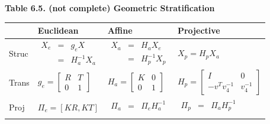 \documentclass{../cheat}
\begin{document}
\begin{multicols}{3}
	

	\textbf{Table 6.5. (not complete) Geometric Stratification}\\


	\begin{tabularx}{\columnwidth}{| @{ }p{20pt}@{ } | @{ }p{59pt}@{ } | @{ }p{51pt} | @{ }X@{ } |}
		\hline
		& \textbf{Euclidean} & \textbf{Affine} & \textbf{Projective} \\ \hline \hline
	
		Struc & $\begin{array}{lcl}
	 		X_e &=& g_e X\\
			&=&H_a^{-1}X_a
			\end{array}$ 
		& $\begin{array}{lcl}
			X_a &=& H_a X_e\\
			&=& H_p^{-1}X_p
			\end{array}$
		  & $X_p=H_p X_a$\\ \hline
		
		Trans &  $g_e=\begin{bmatrix}	R & T \\ 0 &  1 \end{bmatrix}$ &
		$H_a=\begin{bmatrix} K & 0 \\ 0 &  1	\end{bmatrix}$ &
		$H_p=\begin{bmatrix} I & 0 \\ -v^T v_4^{-1} &  v_4^{-1}\end{bmatrix}$ \\ \hline
		
		Proj & $\Pi_{e}=[KR,KT]$ 
		&  $\begin{array}{lcl}
			\Pi_{a} &=& \Pi_{e}H_a^{-1}\\
			\end{array} $
		 & $\begin{array}{lcl}
		 	\Pi_{p} &=& \Pi_{a}H_p^{-1}\\
		 	\end{array} $ \\ \hline	
	\end{tabularx}

\end{multicols}
\end{document}
